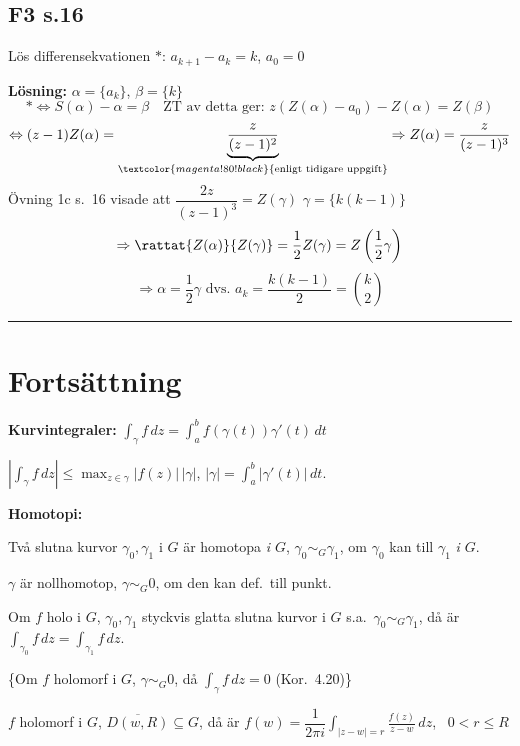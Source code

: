\subsection{F3 s.16}
Lös differensekvationen $*$: $a_{k+1} - a_k = k$, $a_0 = 0$

\textbf{Lösning:} $\alpha = \{a_k\}$, $\beta = \{k\}$
\[ * \Leftrightarrow S(\alpha) - \alpha = \beta \quad \text{ZT av detta ger: } z(Z(\alpha) - a_0) - Z(\alpha) = Z(\beta) \]
\[ \Leftrightarrow (z - 1)Z(\alpha) = \underbrace{\frac{z}{(z - 1)^2}}_{\textcolor{magenta!80!black}{\text{enligt tidigare uppgift}}} \Rightarrow Z(\alpha) = \frac{z}{(z - 1)^3} \]
Övning 1c s.\ 16 visade att $\dfrac{2z}{(z - 1)^3} = Z(\gamma)$ \quad $\gamma = \{k(k - 1)\}$
\[ \Rightarrow \rattat{Z(\alpha)}{Z(\gamma)} = \frac{1}{2}Z(\gamma) = Z\left( \frac{1}{2}\gamma \right) \]
\[ \Rightarrow \alpha = \frac{1}{2}\gamma \text{ dvs.\ } a_k = \frac{k(k - 1)}{2} = \binom{k}{2} \]

\noindent\rule{\linewidth}{0.4pt}

\section*{Fortsättning \textcolor{red!70!black}{}}

\textbf{Kurvintegraler:} \quad $\displaystyle\int_\gamma f\,dz = \int_a^b f(\gamma(t))\gamma'(t)\,dt$

\begin{theorem}
$\displaystyle\left| \int_\gamma f\,dz \right| \le \max_{z \in \gamma} |f(z)|\,|\gamma|$, \quad $|\gamma| = \displaystyle\int_a^b |\gamma'(t)|\,dt$.
\end{theorem}

\textbf{Homotopi:}
\begin{definition}
Två slutna kurvor $\gamma_0, \gamma_1$ i $G$ är homotopa \emph{i $G$}, $\gamma_0 \sim_G \gamma_1$, om $\gamma_0$ kan  till $\gamma_1$ \emph{i $G$}.

$\gamma$ är nollhomotop, $\gamma \sim_G 0$, om den kan def.\ till punkt.
\end{definition}

\begin{theorem}
Om $f$ holo i $G$, $\gamma_0, \gamma_1$ styckvis glatta slutna kurvor i $G$ s.a.\ $\gamma_0 \sim_G \gamma_1$, då är $\displaystyle\int_{\gamma_0} f\,dz = \int_{\gamma_1} f\,dz$.

\textcolor{red!70!black}{\{}Om $f$ holomorf i $G$, $\gamma \sim_G 0$, då $\displaystyle\int_\gamma f\,dz = 0$ (Kor.\ 4.20)\textcolor{red!70!black}{\}}
\end{theorem}

\begin{theorem}
$f$ holomorf i $G$, $\overline{D(w, R)} \subseteq G$, då är $f(w) = \dfrac{1}{2\pi i} \displaystyle\int_{|z - w| = r} \frac{f(z)}{z - w}\,dz$, \ $0 < r \le R$
\end{theorem}
